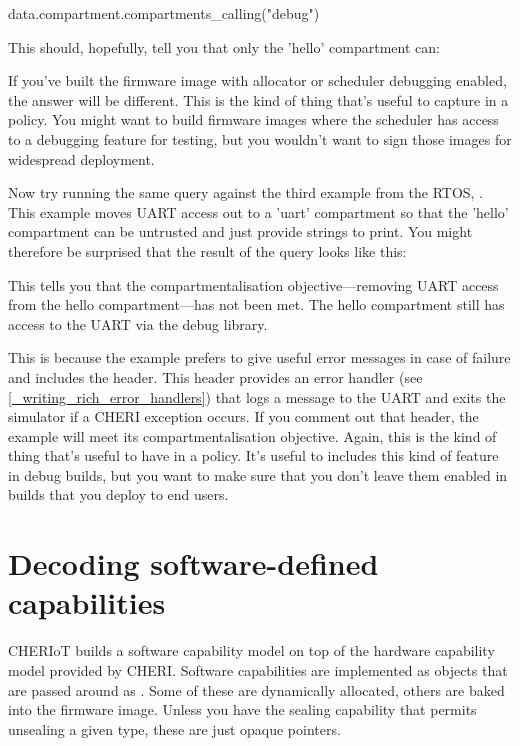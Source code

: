 {\begin{regosnippet}
data.compartment.compartments_calling("debug")
\end{regosnippet}

This should, hopefully, tell you that only the 'hello' compartment can:

\begin{jsonsnippet}
[
  "hello"
]
\end{jsonsnippet}

If you've built the firmware image with allocator or scheduler debugging enabled, the answer will be different.
This is the kind of thing that's useful to capture in a policy.
You might want to build firmware images where the scheduler has access to a debugging feature for testing, but you wouldn't want to sign those images for widespread deployment.

Now try running the same query against the third example from the RTOS, .
This example moves UART access out to a 'uart' compartment so that the 'hello' compartment can be untrusted and just provide strings to print.
You might therefore be surprised that the result of the query looks like this:

\begin{jsonsnippet}
\end{jsonsnippet}

This tells you that the compartmentalisation objective—removing UART access from the hello compartment—has not been met.
The hello compartment still has access to the UART via the debug library.

This is because the example prefers to give useful error messages in case of failure and includes the  header.
This header provides an error handler (see \ref{_writing_rich_error_handlers}) that logs a message to the UART and exits the simulator if a CHERI exception occurs.
If you comment out that header, the example will meet its compartmentalisation objective.
Again, this is the kind of thing that's useful to have in a policy.
It's useful to includes this kind of feature in debug builds, but you want to make sure that you don't leave them enabled in builds that you deploy to end users.

\section{Decoding software-defined capabilities}

CHERIoT builds a software capability model on top of the hardware capability model provided by CHERI.
Software capabilities are implemented as objects that are passed around as .
Some of these are dynamically allocated, others are baked into the firmware image.
Unless you have the sealing capability that permits unsealing a given type, these are just opaque pointers.

}

